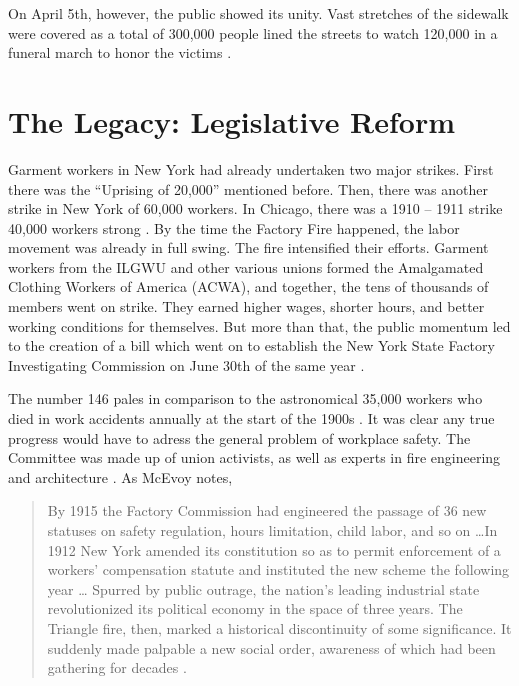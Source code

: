 \documentclass[12pt]{article}
\begin{document}
On April 5th, however, the public showed its unity. Vast stretches of the
sidewalk were covered as a total of 300,000 people lined the streets to watch
120,000 in a funeral march to honor the victims \parencite[644]{Ev1995}.

\section{The Legacy: Legislative Reform}
Garment workers in New York had already undertaken two major strikes. First
there was the ``Uprising of 20,000'' mentioned before. Then, there was another
strike in New York of 60,000 workers. In Chicago, there was a 1910 -- 1911 strike 40,000
workers strong \parencite{WorkingClass}. By the time the Factory Fire
happened, the labor movement was already in full swing. The fire intensified
their efforts. Garment workers from the ILGWU and other various unions formed
the Amalgamated Clothing Workers of America (ACWA), and together, the tens of
thousands of members went on strike. They earned higher wages, shorter hours, 
and better working conditions for themselves. But more than that, the public
momentum led to the creation of a bill which went on to establish the New York
State Factory Investigating Commission on June 30th of the same year
\parencite{Ev1995}.

The number 146 pales in comparison to the astronomical 35,000 workers who died
in work accidents annually at the start of the 1900s \parencite{WorkingClass}.
It was clear any true progress would have to adress the general problem of
workplace safety. The Committee was made up of union activists, as well as experts
in fire engineering and architecture \parencite[5]{martineztriangle}. As McEvoy
notes,

\begin{quote}
By 1915 the Factory Commission had engineered the passage of 36 new statuses on
safety regulation, hours limitation, child labor, and so on \dots In 1912 New
York amended its constitution so as to permit enforcement of a workers'
compensation statute and instituted the new scheme the following year \dots
Spurred by public outrage, the nation's leading industrial state revolutionized
its political economy in the space of three years. The Triangle fire, then,
marked a historical discontinuity of some significance. It suddenly made
palpable a new social order, awareness of which had been gathering for decades
\parencite[646]{Ev1995}.
\end{quote}
\end{document}
